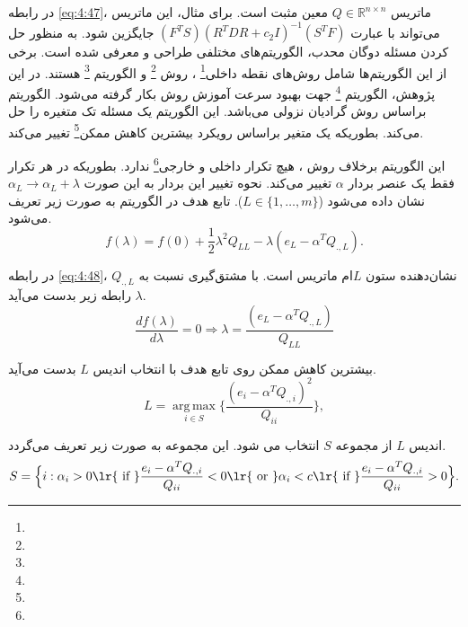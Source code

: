 در رابطه \ref{eq:4:47}، ماتریس  $Q \in \mathbb{R}^{n \times n}$ معین مثبت است.  برای مثال، این ماتریس می‌تواند با عبارت    $(F^{T}S){(R^{T}DR+ c_{2}I)^{-1}}{({S}^{T}F)}$ جایگزین شود.
به منظور حل کردن مسئله دوگان محدب، الگوریتم‌های مختلفی طراحی و معرفی شده است. برخی از این الگوریتم‌ها شامل روش‌های نقطه داخلی\footnote{}   \cite{sra2012}، روش \footnote{} \cite{mang1999} و  الگوریتم \footnote{} \cite{hsieh2008} هستند. در این پژوهش، الگوریتم \footnote{} \cite{peng2014} جهت بهبود سرعت آموزش روش  بکار گرفته می‌شود. الگوریتم  براساس روش گرادیان نزولی می‌باشد. این الگوریتم یک مسئله تک متغیره را حل می‌کند. بطوریکه یک متغیر براساس رویکرد بیشترین کاهش ممکن\footnote{} تغییر می‌کند.

این الگوریتم برخلاف روش ، هیچ تکرار داخلی و خارجی\footnote{}  ندارد. بطوریکه در هر تکرار فقط یک عنصر بردار $\alpha$  تغییر می‌کند. نحوه تغییر این بردار به این صورت $\alpha_{L} \rightarrow \alpha_{L} + \lambda$  نشان داده می‌شود ($L \in \{1,\dots,m\}$). تابع هدف در الگوریتم  به صورت زیر تعریف می‌شود.  
\begin{equation}\label{eq:4:48}
f(\lambda)=f(0) + \frac{1}{2}\lambda^{2}Q_{LL} - \lambda(e_{L} - \alpha^{T}Q_{.,L}).
\end{equation}

در رابطه \ref{eq:4:48}، $Q_{.,L}$  نشان‌دهنده ستون $L$ام ماتریس است. با مشتق‌گیری نسبت به $\lambda$ رابطه زیر بدست می‌آید.
\begin{equation}\label{eq:4:49}
\frac{df(\lambda)}{d\lambda}=0 \Rightarrow \lambda = \frac{(e_{L} - \alpha^{T}Q_{.,L})}{Q_{LL}}
\end{equation}

بیشترین کاهش ممکن روی تابع هدف با انتخاب اندیس $L$ بدست می‌آید.
\begin{equation}\label{eq:4:50}
L = \mathop{arg\,max}\limits_{i \in S}\Big\{\frac{(e_{i} - \alpha^{T}Q_{.,i})^{2}}{Q_{ii}}{} \Big\},
\end{equation}

اندیس  $L$ از مجموعه $S$ انتخاب می شود. این مجموعه به صورت زیر تعریف می‌گردد.
\begin{equation}\label{eq:4:51}
S =\Big\{i:\alpha_{i} > 0 \textrm{\lr{ if }} \frac{e_{i} - \alpha^{T}Q_{.,i}}{Q_{ii}} < 0 \\ \textrm{\lr{ or }}\alpha_{i} < c \textrm{\lr{ if }} \frac{e_{i} - \alpha^{T}Q_{.,i}}{Q_{ii}} > 0 \Big\}.
\end{equation}


